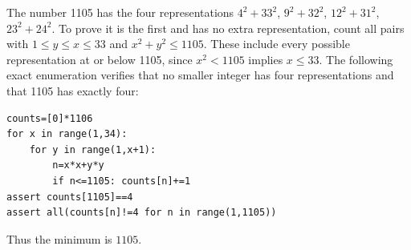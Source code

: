 The number 1105 has the four representations $4^2+33^2$, $9^2+32^2$, $12^2+31^2$, $23^2+24^2$. To prove it is the first and has no extra representation, count all pairs with $1\le y\le x\le33$ and $x^2+y^2\le1105$. These include every possible representation at or below 1105, since $x^2<1105$ implies $x\le33$. The following exact enumeration verifies that no smaller integer has four representations and that 1105 has exactly four:\begin{verbatim}
counts=[0]*1106
for x in range(1,34):
    for y in range(1,x+1):
        n=x*x+y*y
        if n<=1105: counts[n]+=1
assert counts[1105]==4
assert all(counts[n]!=4 for n in range(1,1105))
\end{verbatim}
Thus the minimum is $\boxed{1105}$.
